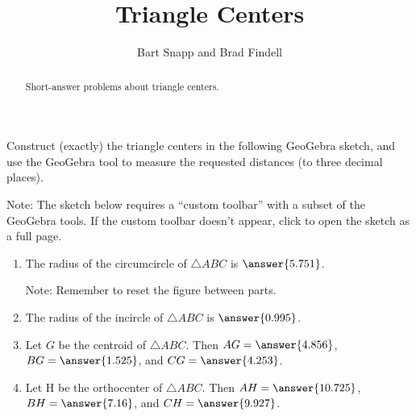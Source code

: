 \documentclass[nooutcomes]{ximera}
\title{Triangle Centers}
\author{Bart Snapp and Brad Findell}
\begin{document}
\begin{abstract}
Short-answer problems about triangle centers. 
\end{abstract}
\maketitle


\begin{problem}
Construct (exactly) the triangle centers in the following 
GeoGebra sketch, and use the GeoGebra tool to measure the requested distances (to three decimal places). 

Note: The sketch below requires a ``custom toolbar'' with a subset of the GeoGebra tools.  If the custom toolbar doesn't appear, click 
 to open the sketch as a full page.  


\begin{center}  
\end{center}
\begin{enumerate}
\item The radius of the circumcircle of $\triangle ABC$ is 
$\answer{5.751}$.  

Note: Remember to reset the figure between parts.   

\item The radius of the incircle of $\triangle ABC$ is 
$\answer{0.995}$.  

\item Let $G$ be the centroid of $\triangle ABC$.  
Then $AG = \answer{4.856}$, $BG = \answer{1.525}$, 
and $CG = \answer{4.253}$.  

\item Let H be the orthocenter of $\triangle ABC$. 
Then $AH = \answer{10.725}$, $BH = \answer{7.16}$, 
and $CH = \answer{9.927}$. 
\end{enumerate}

\end{problem}
\end{document}

